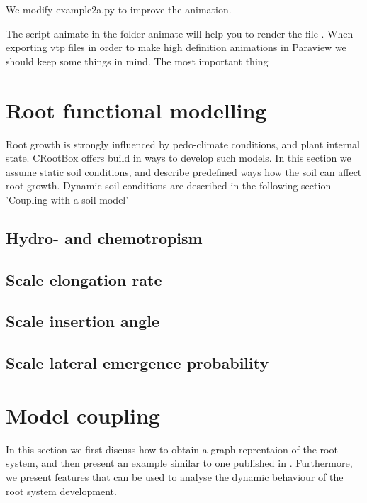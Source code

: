 \documentclass[a4paper]{article}
\begin{document}
We modify example2a.py to improve the animation.

The script animate in the folder animate will help you to render the file .
When exporting vtp files in order to make high definition animations in Paraview we should keep some things in mind. 
The most important thing




\section{Root functional modelling}

Root growth is strongly influenced by pedo-climate conditions, and plant internal state. 
CRootBox offers build in ways to develop such models. 
In this section we assume static soil conditions, and describe predefined ways how the soil can affect root growth.
Dynamic soil conditions are described in the following section 'Coupling with a soil model'

\subsection{Hydro- and chemotropism}





\subsection{Scale elongation rate}



\subsection{Scale insertion angle}

\subsection{Scale lateral emergence probability}



\section{Model coupling}

In this section we first discuss how to obtain a graph reprentaion of the root system, and then present an example similar to one published in \cite{}. 
Furthermore, we present features that can be used to analyse the dynamic behaviour of the root system development.
\end{document}
